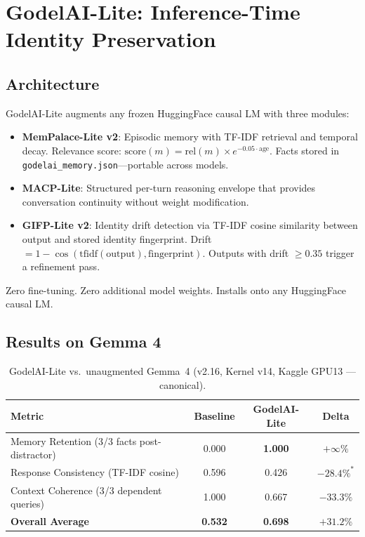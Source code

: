 \documentclass[12pt]{article}
\begin{document}
\section{GodelAI-Lite: Inference-Time Identity Preservation}
\label{sec:godelai-lite}

\subsection{Architecture}

GodelAI-Lite augments any frozen HuggingFace causal LM with three modules:

\begin{itemize}
  \item \textbf{MemPalace-Lite v2}: Episodic memory with TF-IDF retrieval
        and temporal decay.
        Relevance score: $\mathrm{score}(m) = \mathrm{rel}(m) \times e^{-0.05 \cdot \mathrm{age}}$.
        Facts stored in \texttt{godelai\_memory.json}---portable across models.
  \item \textbf{MACP-Lite}: Structured per-turn reasoning envelope that
        provides conversation continuity without weight modification.
  \item \textbf{GIFP-Lite v2}: Identity drift detection via TF-IDF cosine
        similarity between output and stored identity fingerprint.
        Drift $= 1 - \cos(\mathrm{tfidf}(\mathrm{output}), \mathrm{fingerprint})$.
        Outputs with drift $\geq 0.35$ trigger a refinement pass.
\end{itemize}

Zero fine-tuning. Zero additional model weights. Installs onto any HuggingFace
causal LM.

\subsection{Results on Gemma 4}

\begin{table}[ht]
\centering
\caption{GodelAI-Lite vs.\ unaugmented Gemma~4 (v2.16, Kernel v14, Kaggle GPU13 --- canonical).}
\label{tab:godelai-lite}
\begin{tabular}{lccc}
\toprule
\textbf{Metric} & \textbf{Baseline} & \textbf{GodelAI-Lite} & \textbf{Delta} \\
\midrule
Memory Retention (3/3 facts post-distractor) & 0.000 & \textbf{1.000} & $+\infty\%$ \\
Response Consistency (TF-IDF cosine) & 0.596 & 0.426 & $-28.4\%^*$ \\
Context Coherence (3/3 dependent queries) & 1.000 & 0.667 & $-33.3\%$ \\
\midrule
\textbf{Overall Average} & \textbf{0.532} & \textbf{0.698} & $\mathbf{+31.2\%}$ \\
\bottomrule
\end{tabular}
\end{table}
\end{document}

